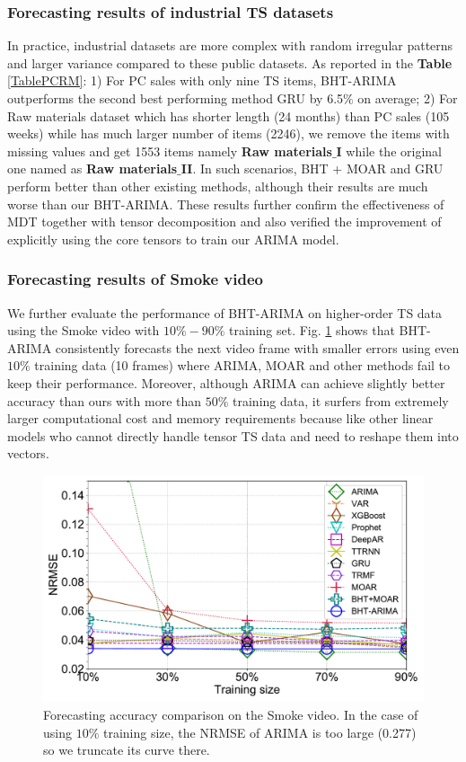 \documentclass[letterpaper]{article} %
\numberwithin{theorem}{section}
\begin{document}
\subsubsection{Forecasting results of  industrial TS datasets}
In practice, industrial datasets are more complex with  random irregular patterns and larger variance compared to these  public  datasets.  As reported in the \textbf{Table} \ref{TablePCRM}: 1) For PC sales with only nine TS items,  BHT-ARIMA   outperforms the second best performing method GRU  by  6.5$\%$ on average; 2) For Raw materials dataset which has shorter length (24 months) than PC sales (105 weeks) while has much larger number of  items (2246), we remove the items with missing values and get  1553 items namely \textbf{Raw materials$\_$I} while the original one named as \textbf{Raw materials$\_$II}.  In such scenarios,  BHT + MOAR and GRU perform better than other existing methods, although their  results are much worse than our BHT-ARIMA.   These results further confirm the effectiveness of MDT together with tensor decomposition and also verified the improvement of explicitly using the core tensors to train our ARIMA model. 


\subsubsection{Forecasting results of Smoke video} 
We further evaluate the performance of BHT-ARIMA on higher-order TS data using the  Smoke video with $10\% - 90\%$ training set.  Fig. \ref{Figvideo} shows that BHT-ARIMA consistently forecasts the next video frame with  smaller errors using even $10\%$ training data (10 frames) where ARIMA, MOAR and other methods fail to keep their  performance. Moreover,  although ARIMA can achieve  slightly better accuracy than ours  with  more than $50\%$ training data,  it surfers from extremely larger computational cost and memory requirements because like other  linear models who cannot directly handle  tensor TS data  and  need to reshape  them into vectors. 
\begin{figure}[ttt!]    
	\centering
	\includegraphics[width=0.8\columnwidth ]{Fig4_Video_TSF.pdf}
	\caption{\label{Figvideo}Forecasting accuracy comparison on the Smoke video. In the case of using $10\%$ training size,   the  NRMSE of ARIMA is too large  (0.277) so we truncate its curve there.}
\end{figure}
\end{document}
